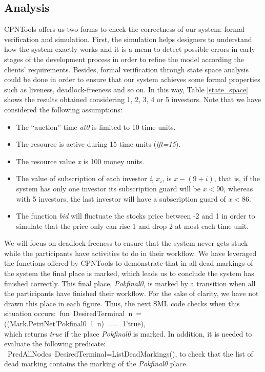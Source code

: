 \subsection*{Analysis}\label{analysis}
CPNTools offers us two forms to check the correctness of our system: formal verification and simulation. 
First, the simulation helps designers to understand how the system exactly works and it is a mean to
detect possible errors in early stages of the development process in order to refine the model according the
clients' requirements. Besides, formal verification through state space
analysis could be done in order to ensure that our system achieves some formal properties such as liveness, deadlock-freeness and so on.
In this way, Table \ref{state_space} shows the
results obtained considering 1, 2, 3, 4 or 5 investors. Note that we have considered the following assumptions:

\begin{itemize}
 \item The ``auction'' time {\em at0} is limited to 10 time units.
 \item The resource is active during 15 time units ({\em lft=15}).
 \item The resource value {\em x} is 100 money units.
 \item The value of subscription of each investor {\em i}, {\em $x_i$}, is $x-(9+i)$, that is, if the system has only one investor its subscription guard will be $x<90$, whereas with 5 investors, the last investor will have a subscription guard of $x<86$.
 \item The function {\it bid} will fluctuate the stocks price between -2 and 1 in order to simulate that the price only can rise 1 and drop 2 at most each time unit. 
\end{itemize}
We will focus on deadlock-freeness to ensure that the
system never gets stuck while the participants have activities to do
in their workflow. We have leveraged the functions offered by CPNTools
to demonstrate that in all dead markings of the system the final
place is marked, which leads us to conclude the system has finished
correctly. This final place, {\em Pokfinal0}, is marked by a transition when all the participants have finished their workflow. For the sake of clarity, we have not drawn this place in each figure. Thus, the next SML code checks when this situation
occurs:\ \mbox{{\small{fun DesiredTerminal n =((Mark.PetriNet'Pokfinal0
1 n) ==
1'true)}}}, \\
which returns {\em true} if the place {\it Pokfinal0} is marked. In
addition, it is needed to evaluate the following predicate:
\mbox{{\small{  PredAllNodes
DesiredTerminal=ListDeadMarkings()}}}, to check that the list of
dead marking contains the marking of the {\em Pokfinal0} place.

